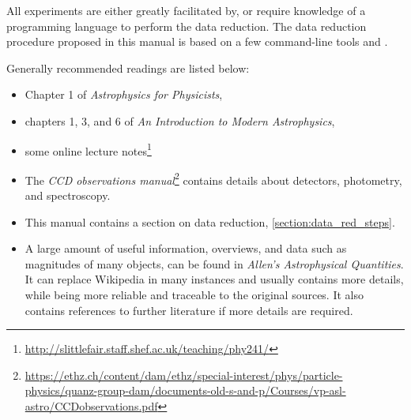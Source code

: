 \documentclass[a4paper, 11pt, fleqn]{memoir}
\begin{document}
All experiments are either greatly facilitated by, or require knowledge of a programming language to perform the data reduction.
The data reduction procedure proposed in this manual is based on a few command-line tools and .

Generally recommended readings are listed below:
\begin{itemize}
    \item Chapter 1 of \emph{Astrophysics for Physicists}\autocite{Choudhuri}, \item chapters 1, 3, and 6 of \emph{An Introduction to Modern Astrophysics}\autocite{carroll2017introduction},
    \item some online lecture notes\footnote{\url{http://slittlefair.staff.shef.ac.uk/teaching/phy241/}}%
    \item The \emph{CCD observations manual}\footnote{\url{https://ethz.ch/content/dam/ethz/special-interest/phys/particle-physics/quanz-group-dam/documents-old-s-and-p/Courses/vp-asl-astro/CCDobservations.pdf}} contains details about detectors, photometry, and spectroscopy.
    \item This manual contains a section on data reduction, \cref{section:data_red_steps}.
    \item A large amount of useful information, overviews, and data such as magnitudes of many objects, can be found in \emph{Allen's Astrophysical Quantities}\autocite{AllensAstrophysicalQuantities}. It can replace Wikipedia in many instances and usually contains more details, while being more reliable and traceable to the original sources. It also contains references to further literature if more details are required.
\end{itemize}
\end{document}

